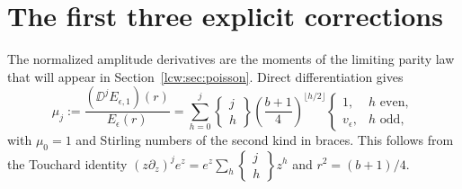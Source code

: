 \documentclass[11pt,letterpaper]{article}
\theoremstyle{remark}\newtheorem{remark}[theorem]{Remark}
\begin{document}
\section{The first three explicit corrections}\label{lcw:sec:coefficients}
The normalized amplitude derivatives are the moments of the limiting parity law that will appear in Section~\ref{lcw:sec:poisson}. Direct differentiation gives
\begin{equation}\label{lcw:eq:mu}
 \mu_j:=\frac{(\DD^jE_{\epsilon,1})(r)}{E_\epsilon(r)}
 =\sum_{h=0}^j\left\{\!\begin{matrix}j\\h\end{matrix}\!\right\}
 \left(\frac{b+1}{4}\right)^{\lfloor h/2\rfloor}
 \begin{cases}1,&h\text{ even},\\v_\epsilon,&h\text{ odd},\end{cases}
\end{equation}
with $\mu_0=1$ and Stirling numbers of the second kind in braces. This follows from the Touchard identity
$(z\partial_z)^je^z=e^z\sum_h\left\{\begin{smallmatrix}j\\h\end{smallmatrix}\right\}z^h$ and $r^2=(b+1)/4$.
\end{document}
